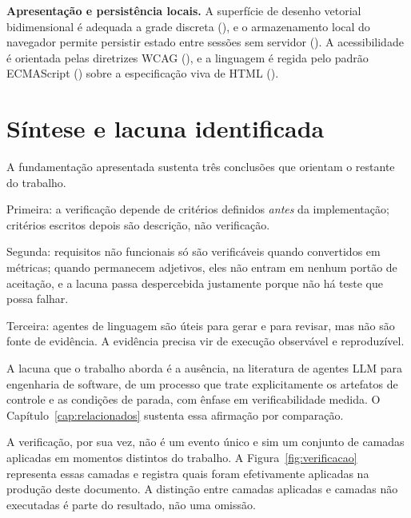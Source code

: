 \textbf{Apresentação e persistência locais.} A superfície de desenho vetorial
bidimensional é adequada a grade discreta (), e o
armazenamento local do navegador permite persistir estado entre sessões sem
servidor (). A acessibilidade é orientada pelas
diretrizes WCAG (), e a linguagem é regida pelo padrão
ECMAScript () sobre a especificação viva de HTML
().

\section{Síntese e lacuna identificada}
\label{sec:sintese}

A fundamentação apresentada sustenta três conclusões que orientam o restante do
trabalho.

Primeira: a verificação depende de critérios definidos \emph{antes} da
implementação; critérios escritos depois são descrição, não verificação.

Segunda: requisitos não funcionais só são verificáveis quando convertidos em
métricas; quando permanecem adjetivos, eles não entram em nenhum portão de
aceitação, e a lacuna passa despercebida justamente porque não há teste que possa
falhar.

Terceira: agentes de linguagem são úteis para gerar e para revisar, mas não são
fonte de evidência. A evidência precisa vir de execução observável e
reproduzível.

A lacuna que o trabalho aborda é a ausência, na literatura de agentes LLM para
engenharia de software, de um processo que trate explicitamente os artefatos de
controle e as condições de parada, com ênfase em verificabilidade medida. O
Capítulo~\ref{cap:relacionados} sustenta essa afirmação por comparação.

A verificação, por sua vez, não é um evento único e sim um conjunto de camadas
aplicadas em momentos distintos do trabalho. A Figura~\ref{fig:verificacao}
representa essas camadas e registra quais foram efetivamente aplicadas na
produção deste documento. A distinção entre camadas aplicadas e camadas não
executadas é parte do resultado, não uma omissão.


